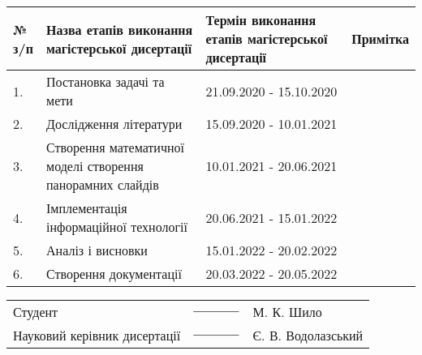 \begin{table}[H]
    \centering
    \begin{tabular}{|p{0.2in} | p{2.9in} | p{2.1in} | p{0.9in}|}
        \hline
        № з/п & Назва етапів виконання магістерської дисертації            & Термін виконання етапів магістерської дисертації & Примітка \\
        \hline
        1.    & Постановка задачі та мети                                  & 21.09.2020 - 15.10.2020                          &          \\
        \hline
        2.    & Дослідження літератури                                     & 15.09.2020 - 10.01.2021                          &          \\
        \hline
        3.    & Створення математичної моделі створення панорамних слайдів & 10.01.2021 - 20.06.2021                          &          \\
        \hline
        4.    & Імплементація інформаційної технології                     & 20.06.2021 - 15.01.2022                          &          \\
        \hline
        5.    & Аналіз і висновки                                          & 15.01.2022 - 20.02.2022                          &          \\
        \hline
        6.    & Створення документації                                     & 20.03.2022 - 20.05.2022                          &          \\
        \hline
    \end{tabular}
\end{table}


\begin{table}[H]
    \centering
    \begin{tabular}{p{3.7in} p{1.2in} p{1.8in}}

        Студент                      & ${\text{\underline{\hspace{4em}}}}$  & М. К. Шило         \\
        Науковий керівник дисертації & ${\text{\underline{\hspace{4em}}}} $ & Є. В. Водолазський
    \end{tabular}
\end{table}

\clearpage

